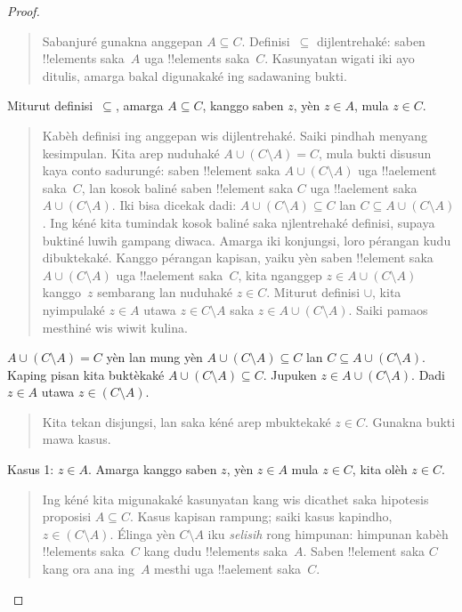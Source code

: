 \documentclass[../../../include/open-logic-section]{subfiles}
\begin{document}
\begin{proof}
\begin{quote}
    Sabanjuré gunakna anggepan $A \subseteq C$.
    Definisi~$\subseteq$ dijlentrehaké: saben !!{element}s
    saka~$A$ uga !!{element}s saka~$C$. Kasunyatan wigati
    iki ayo ditulis, amarga bakal digunakaké ing sadawaning
    bukti.
  \end{quote}
  Miturut definisi~$\subseteq$, amarga $A \subseteq C$,
  kanggo saben $z$, yèn $z \in A$, mula $z \in C$.
  \begin{quote}
    Kabèh definisi ing anggepan wis dijlentrehaké. Saiki
    pindhah menyang kesimpulan. Kita arep nuduhaké
    $A \cup (C \setminus A) = C$, mula bukti disusun kaya
    conto sadurungé: saben !!{element} saka
    $A \cup (C \setminus A)$ uga !!a{element} saka~$C$,
    lan kosok baliné saben !!{element} saka $C$ uga
    !!a{element} saka $A \cup (C
    \setminus A)$. Iki bisa dicekak dadi:
    $A \cup (C \setminus A)
    \subseteq C$ lan $C \subseteq A \cup (C \setminus A)$.
    Ing kéné kita tumindak kosok baliné saka njlentrehaké
    definisi, supaya buktiné luwih gampang diwaca.
    Amarga iki konjungsi, loro pérangan kudu dibuktekaké.
    Kanggo pérangan kapisan, yaiku yèn saben
    !!{element} saka $A \cup (C \setminus A)$ uga
    !!a{element} saka~$C$, kita nganggep
    $z \in A \cup (C \setminus A)$ kanggo~$z$ sembarang
    lan nuduhaké $z \in C$. Miturut definisi
    $\cup$, kita nyimpulaké $z \in A$ utawa
    $z \in C \setminus A$ saka
    $z \in A \cup (C \setminus A)$.
    Saiki pamaos mesthiné wis wiwit kulina.
  \end{quote}
  $A \cup (C \setminus A) = C$ yèn lan mung yèn
  $A \cup (C \setminus A) \subseteq
  C$ lan $C \subseteq A \cup (C \setminus A)$.
  Kaping pisan kita buktèkaké
  $A \cup (C \setminus A) \subseteq C$.
  Jupuken $z \in A \cup (C
  \setminus A)$. Dadi $z \in A$ utawa
  $z \in (C \setminus A)$.
  \begin{quote}
    Kita tekan disjungsi, lan saka kéné arep
    mbuktekaké $z \in C$. Gunakna bukti mawa kasus.
  \end{quote}
  Kasus 1: $z \in A$. Amarga kanggo saben $z$,
  yèn $z \in A$ mula $z \in C$, kita olèh $z \in C$.
  \begin{quote}
    Ing kéné kita migunakaké kasunyatan kang wis
    dicathet saka hipotesis proposisi $A \subseteq C$.
    Kasus kapisan rampung; saiki kasus kapindho,
    $z \in (C
    \setminus A)$. Élinga yèn $C \setminus A$ iku
    \emph{selisih} rong himpunan: himpunan kabèh
    !!{element}s saka~$C$ kang dudu !!{element}s saka~$A$.
    Saben !!{element} saka $C$ kang ora ana ing~$A$
    mesthi uga !!a{element} saka~$C$.

\end{quote}
\end{proof}
\end{document}
